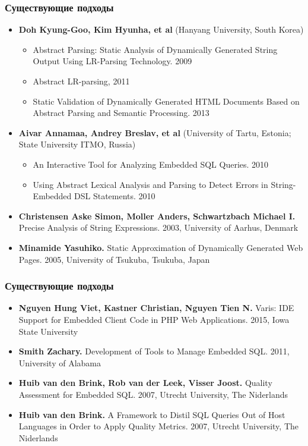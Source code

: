 \documentclass{beamer}
\begin{document}
\begin{frame}
    \transwipe[direction=90]
    \frametitle{Существующие подходы}
    \begin{itemize}
        \item \textbf{Doh Kyung-Goo, Kim Hyunha, et al} {\small{(Hanyang University, South Korea)}}
        \begin{itemize}
            \item Abstract Parsing: Static Analysis of Dynamically Generated String Output Using LR-Parsing Technology. 2009
            \item Abstract LR-parsing, 2011
            \item Static Validation of Dynamically Generated HTML Documents Based on Abstract Parsing and Semantic Processing. 2013
        \end{itemize}
        \item \textbf{Aivar Annamaa, Andrey Breslav, et al} (University of Tartu, Estonia; State University ITMO, Russia)
        \begin{itemize}
            \item An Interactive Tool for Analyzing Embedded SQL Queries. 2010
            \item Using Abstract Lexical Analysis and Parsing to Detect Errors in String-Embedded DSL Statements. 2010
        \end{itemize}
        \item \textbf{Christensen Aske Simon, Moller Anders, Schwartzbach Michael I.} Precise Analysis of String Expressions. 2003, University of Aarhus, Denmark
        \item \textbf{Minamide Yasuhiko.} Static Approximation of Dynamically Generated Web Pages. 2005, University of Tsukuba, Tsukuba, Japan
    \end{itemize}
\end{frame}

\begin{frame}
    \transwipe[direction=90]
    \frametitle{Существующие подходы}
    \begin{itemize}
        \item \textbf{Nguyen Hung Viet, Kastner Christian, Nguyen Tien N.} Varis: IDE Support for Embedded Client Code in PHP Web Applications. 2015, Iowa State University

        \item \textbf{Smith Zachary.} Development of Tools to Manage Embedded SQL.  2011, University of Alabama
        \item \textbf{Huib van den Brink, Rob van der Leek, Visser Joost.} Quality Assessment for Embedded SQL. 2007, Utrecht University, The Niderlands
        \item \textbf{Huib van den Brink.} A Framework to Distil SQL Queries Out of Host Languages in Order to Apply Quality Metrics.  2007, Utrecht University, The Niderlands
    \end{itemize}
\end{frame}
\end{document}
